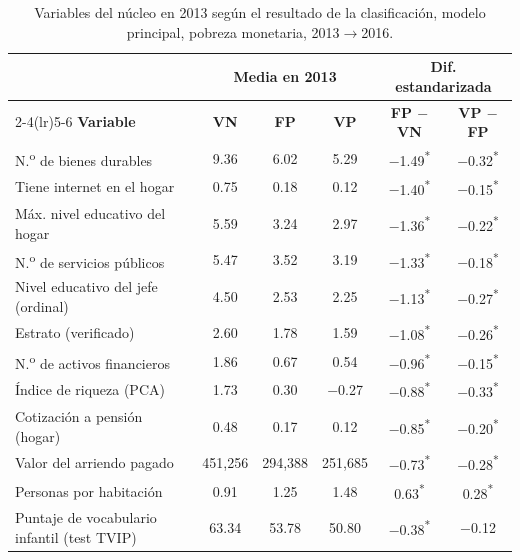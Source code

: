 \begin{table}[H]
  \centering
  \caption{Variables del núcleo en 2013 según el resultado de la clasificación, modelo
  principal, pobreza monetaria, 2013$\to$2016.}
  \label{tab:errores_nucleo}
  \footnotesize
  \setlength{\tabcolsep}{4pt}
  \begin{tabular}{l ccc cc}
    \toprule
    & \multicolumn{3}{c}{\textbf{Media en 2013}} & \multicolumn{2}{c}{\textbf{Dif. estandarizada}} \\
    \cmidrule(lr){2-4}\cmidrule(lr){5-6}
    \textbf{Variable} & \textbf{VN} & \textbf{FP} & \textbf{VP} & \textbf{FP $-$ VN} & \textbf{VP $-$ FP} \\
    \midrule
    N.\textsuperscript{o} de bienes durables & 9.36 & 6.02 & 5.29 & $-$1.49\textsuperscript{*} & $-$0.32\textsuperscript{*} \\
    Tiene internet en el hogar & 0.75 & 0.18 & 0.12 & $-$1.40\textsuperscript{*} & $-$0.15\textsuperscript{*} \\
    Máx. nivel educativo del hogar & 5.59 & 3.24 & 2.97 & $-$1.36\textsuperscript{*} & $-$0.22\textsuperscript{*} \\
    N.\textsuperscript{o} de servicios públicos & 5.47 & 3.52 & 3.19 & $-$1.33\textsuperscript{*} & $-$0.18\textsuperscript{*} \\
    Nivel educativo del jefe (ordinal) & 4.50 & 2.53 & 2.25 & $-$1.13\textsuperscript{*} & $-$0.27\textsuperscript{*} \\
    Estrato (verificado) & 2.60 & 1.78 & 1.59 & $-$1.08\textsuperscript{*} & $-$0.26\textsuperscript{*} \\
    N.\textsuperscript{o} de activos financieros & 1.86 & 0.67 & 0.54 & $-$0.96\textsuperscript{*} & $-$0.15\textsuperscript{*} \\
    Índice de riqueza (PCA) & 1.73 & 0.30 & $-$0.27 & $-$0.88\textsuperscript{*} & $-$0.33\textsuperscript{*} \\
    Cotización a pensión (hogar) & 0.48 & 0.17 & 0.12 & $-$0.85\textsuperscript{*} & $-$0.20\textsuperscript{*} \\
    Valor del arriendo pagado & 451{,}256 & 294{,}388 & 251{,}685 & $-$0.73\textsuperscript{*} & $-$0.28\textsuperscript{*} \\
    Personas por habitación & 0.91 & 1.25 & 1.48 & 0.63\textsuperscript{*} & 0.28\textsuperscript{*} \\
    Puntaje de vocabulario infantil (test TVIP) & 63.34 & 53.78 & 50.80 & $-$0.38\textsuperscript{*} & $-$0.12 \\

\end{tabular}
\end{table}
